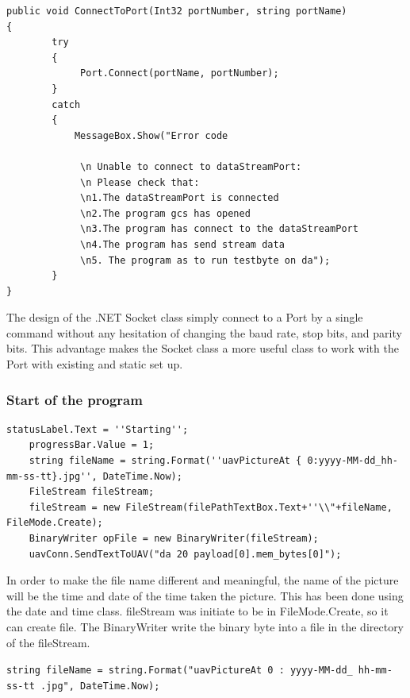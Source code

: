 \begin{lstlisting}[caption={connect to port},label=lst:connectT]
public void ConnectToPort(Int32 portNumber, string portName)
{
        try            
        {
             Port.Connect(portName, portNumber);                
        }            
        catch 
        {            
            MessageBox.Show("Error code
                
             \n Unable to connect to dataStreamPort:
             \n Please check that:                
             \n1.The dataStreamPort is connected                 
             \n2.The program gcs has opened                 
             \n3.The program has connect to the dataStreamPort                
             \n4.The program has send stream data                
             \n5. The program as to run testbyte on da");                
        }            
}
        \end{lstlisting}

        
	The design of the .NET Socket class simply connect to a Port by a single command without any hesitation of changing the baud rate, stop bits, and parity bits. This advantage makes the Socket class a more useful class to work with the Port with existing and static set up. 

\subsubsection*{Start of the program}

\begin{lstlisting}[caption={Start of the program}, label=lst:payload_shared_mem_set]
	statusLabel.Text = ''Starting'';   
	progressBar.Value = 1;   
	string fileName = string.Format(''uavPictureAt { 0:yyyy-MM-dd_hh-mm-ss-tt}.jpg'', DateTime.Now);
	FileStream fileStream;
	fileStream = new FileStream(filePathTextBox.Text+''\\"+fileName, FileMode.Create);      
	BinaryWriter opFile = new BinaryWriter(fileStream);
	uavConn.SendTextToUAV("da 20 payload[0].mem_bytes[0]");      
 \end{lstlisting}
             In order to make the file name different and meaningful, the name of the picture will be the time and date of the time taken the picture. This has been done using the date and time class. fileStream was initiate to be in FileMode.Create, so it can create file. The BinaryWriter write the binary byte into a file in the directory of the fileStream. 
            
\texttt{string fileName = string.Format("uavPictureAt{ 0 : yyyy-MM-dd\_ hh-mm-ss-tt}
 .jpg", DateTime.Now);   }  
        
